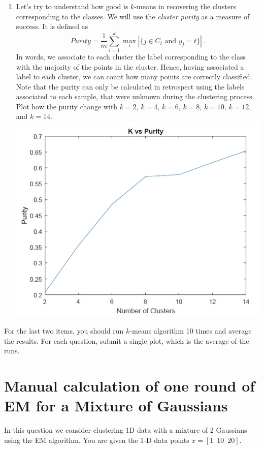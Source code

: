 \documentclass{article}
\begin{document}
\begin{enumerate}[label=(\alph*)]
\item Let's try to understand how good is $k$-means in recovering the clusters corresponding to the classes. We will use the \emph{cluster purity} as a measure of success. It is defined as 
\[
Purity = \frac{1}{m} \sum_{i=1}^k \max_t |\{j \in C_i \text{ and } y_j=t \}|~.
\]
In words, we associate to each cluster the label corresponding to the class with the majority of the points in the cluster. Hence, having associated a label to each cluster, we can count how many points are correctly classified. Note that the purity can only be calculated in retrospect using the labels associated to each sample, that were unknown during the clustering process.
Plot how the purity change with $k = 2$, $k=4$, $k=6$, $k=8$, $k=10$, $k=12$, and $k=14$.\\
\includegraphics[width=150mm,scale=0.5]{purity_3}
\end{enumerate}

For the last two items, you should run $k$-means algorithm 10 times and average the results. For each question, submit a single plot, which is the average of the runs.


\section{Manual calculation of one round of EM for a Mixture of Gaussians}

In this question we consider clustering 1D data with a mixture of 2 Gaussians using the EM algorithm. You are given the 1-D data points $x = [1 \,\,\, 10 \,\,\, 20]$. 
\end{document}
